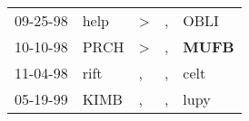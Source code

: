 \begin{supertabular}{p{0.07\textwidth}p{0.06\textwidth}p{0.02\textwidth}p{0.02\textwidth}p{0.06\textwidth}}
 09-25-98\textsuperscript{} &  help\textsuperscript{} &  \textgreater &  , &           OBLI\textsuperscript{} \\
 10-10-98\textsuperscript{} &  PRCH\textsuperscript{} &  \textgreater &  , &  \textbf{MUFB\textsuperscript{}} \\
 11-04-98\textsuperscript{} &  rift\textsuperscript{} &             , &  , &           celt\textsuperscript{} \\
 05-19-99\textsuperscript{} &  KIMB\textsuperscript{} &             , &  , &           lupy\textsuperscript{} \\
\end{supertabular}
